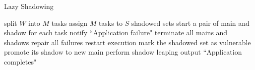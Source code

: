 \begin{algorithm}[t]
  \caption{Lazy Shadowing}
  \BlankLine
  split $W$ into $M$ tasks\;  
  assign $M$ tasks to $S$ shadowed sets\;  
  start a pair of main and shadow for each task\;
    {
        {
            {
                notify ``Application failure"\;
                terminate all mains and shadows\;
                repair all failures\;
                restart execution\; %
            }
            {
                mark the shadowed set as vulnerable\;
                {
                    promote its shadow to new main\;
                    perform shadow leaping\; %
                }
            }
        }  
    }
    output ``Application completes"\;
  \label{al:ls}
\end{algorithm}

